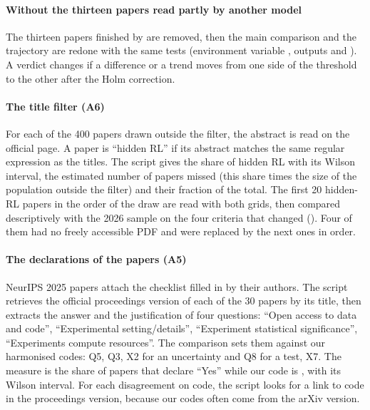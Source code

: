 \paragraph{Without the thirteen papers read partly by another model}
The thirteen papers finished by  are removed, then the main comparison and the
trajectory are redone with the same tests (environment variable , outputs
 and ). A verdict changes if
a difference or a trend moves from one side of the threshold to the other after the Holm correction.

\paragraph{The title filter (A6)}
For each of the 400 papers drawn outside the filter, the abstract is read on the official page. A paper
is \enquote{hidden RL} if its abstract matches the same regular expression as the titles. The script
 gives the share of hidden RL with its Wilson interval, the estimated
number of papers missed (this share times the size of the population outside the filter) and their
fraction of the total. The first 20 hidden-RL papers in the order of the draw are read with both grids,
then compared descriptively with the 2026 sample on the four criteria that changed
(). Four of them had no freely accessible PDF and were replaced by
the next ones in order.

\paragraph{The declarations of the papers (A5)}
NeurIPS 2025 papers attach the checklist filled in by their authors. The script 
retrieves the official proceedings version of each of the 30 papers by its title, then extracts the
answer and the justification of four questions: \enquote{Open access to data and code},
\enquote{Experimental setting/details}, \enquote{Experiment statistical significance},
\enquote{Experiments compute resources}. The comparison sets them against our
harmonised codes: Q5, Q3, X2 for an uncertainty and Q8 for a test, X7. The measure is the share of
papers that declare \enquote{Yes} while our code is , with its Wilson interval. For each
disagreement on code, the script looks for a link to code in the proceedings version, because our codes
often come from the arXiv version.

